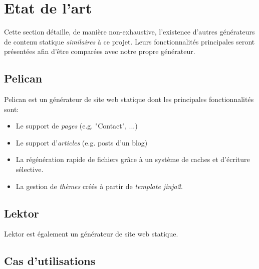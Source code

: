 \section{Etat de l'art}
	
	Cette section détaille, de manière non-exhaustive, l'existence d'autres générateurs de contenu statique \textit{similaires} à ce projet. Leurs fonctionnalités principales seront présentées afin d'être comparées avec notre propre générateur.
	
	\subsection*{Pelican}
		Pelican est un générateur de site web statique dont les principales fonctionnalités sont:
		\begin{itemize}
			\item Le support de \textit{pages} (e.g. "Contact", ...)
			\item Le support d'\textit{articles} (e.g. posts d'un blog)
			\item La régénération rapide de fichiers grâce à un système de caches et d'écriture sélective.
			\item La gestion de \textit{thèmes} créés à partir de \textit{template jinja2}.
		\end{itemize}
		
	\subsection*{Lektor}
		Lektor est également un générateur de site web statique. 

	\subsection{Cas d'utilisations}